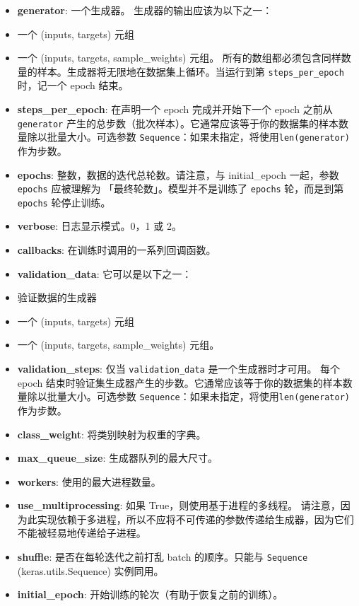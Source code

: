 \begin{itemize}
\tightlist
\item
  \textbf{generator}: 一个生成器。 生成器的输出应该为以下之一：
\item
  一个 (inputs, targets) 元组
\item
  一个 (inputs, targets, sample\_weights) 元组。
  所有的数组都必须包含同样数量的样本。生成器将无限地在数据集上循环。当运行到第
  \texttt{steps\_per\_epoch} 时，记一个 epoch 结束。
\item
  \textbf{steps\_per\_epoch}: 在声明一个 epoch 完成并开始下一个 epoch
  之前从 \texttt{generator}
  产生的总步数（批次样本）。它通常应该等于你的数据集的样本数量除以批量大小。可选参数
  \texttt{Sequence}：如果未指定，将使用\texttt{len(generator)}
  作为步数。
\item
  \textbf{epochs}: 整数，数据的迭代总轮数。请注意，与 initial\_epoch
  一起，参数 \texttt{epochs} 应被理解为 「最终轮数」。模型并不是训练了
  \texttt{epochs} 轮，而是到第 \texttt{epochs} 轮停止训练。
\item
  \textbf{verbose}: 日志显示模式。0，1 或 2。
\item
  \textbf{callbacks}: 在训练时调用的一系列回调函数。
\item
  \textbf{validation\_data}: 它可以是以下之一：
\item
  验证数据的生成器
\item
  一个 (inputs, targets) 元组
\item
  一个 (inputs, targets, sample\_weights) 元组。
\item
  \textbf{validation\_steps}: 仅当 \texttt{validation\_data}
  是一个生成器时才可用。 每个 epoch
  结束时验证集生成器产生的步数。它通常应该等于你的数据集的样本数量除以批量大小。可选参数
  \texttt{Sequence}：如果未指定，将使用\texttt{len(generator)}
  作为步数。
\item
  \textbf{class\_weight}: 将类别映射为权重的字典。
\item
  \textbf{max\_queue\_size}: 生成器队列的最大尺寸。
\item
  \textbf{workers}: 使用的最大进程数量。
\item
  \textbf{use\_multiprocessing}: 如果 True，则使用基于进程的多线程。
  请注意，因为此实现依赖于多进程，所以不应将不可传递的参数传递给生成器，因为它们不能被轻易地传递给子进程。
\item
  \textbf{shuffle}: 是否在每轮迭代之前打乱 batch 的顺序。只能与
  \texttt{Sequence} (keras.utils.Sequence) 实例同用。
\item
  \textbf{initial\_epoch}: 开始训练的轮次（有助于恢复之前的训练）。
\end{itemize}

